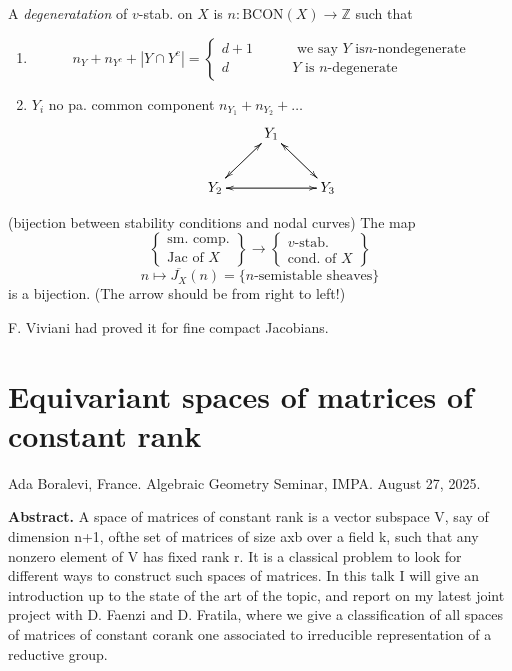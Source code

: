 \begin{definition}
\label{definition-n-degeneracy}
A {\it degeneratation} of $v$-stab. on $X$ is
$n:\text{BCON}(X) \to \mathbb{Z}$
such that
\begin{enumerate}
\item
$$
n_Y+n_{Y^c}+|Y \cap Y^c|=
\begin{cases}
d+1\qquad &\text{ we say $Y$ is
$n$-nondegenerate} \\
d\qquad &\text{$Y$ is $n$-degenerate}
\end{cases}
$$
\item $Y_i$ no pa. common component
$n_{Y_1}+n_{Y_2}+\ldots$
$$
\xymatrix{
&Y_1\ar[dr]\ar[dl]\\
Y_2\ar[ur]\ar[rr]&&Y_3\ar[ll]\ar[ul]
}
$$
\end{enumerate}
\end{definition}

\begin{theorem}[-, et al]
\label{theorem-bijec-stabi-condi-nodal}
(bijection between stability conditions and
nodal curves) The map
$$
\left\{ \substack{\text{sm. comp.} \\
\text{Jac of $X$}} \right\} \to
\left\{ \substack{\text{$v$-stab.} \\
\text{cond. of $X$}} \right\}
$$
$$
n\mapsto
\overline{J_X}(n)=\{n\text{-semistable
sheaves}\}
$$
is a bijection. (The arrow should be from
right to left!)
\end{theorem}

F. Viviani had proved it for fine compact
Jacobians.

\section{Equivariant spaces of matrices of
constant rank}
\label{section-equiv-space-matri-const}

\noindent
Ada Boralevi, France.
Algebraic Geometry Seminar, IMPA.
August 27, 2025.

\medskip\noindent
{\bf Abstract.} A space of matrices of
constant rank is a vector subspace V, say
of dimension n+1, ofthe set of matrices of
size axb over a field k, such that
any nonzero element of V has fixed rank r. It
is a classical problem to look for
different ways to construct such spaces of
matrices. In this talk I will give an
introduction up to the state of the art of
the topic, and report on my latest
joint project with D. Faenzi and D. Fratila,
where we give a classification of
all spaces of matrices of constant corank one
associated to irreducible
representation of a reductive group.

